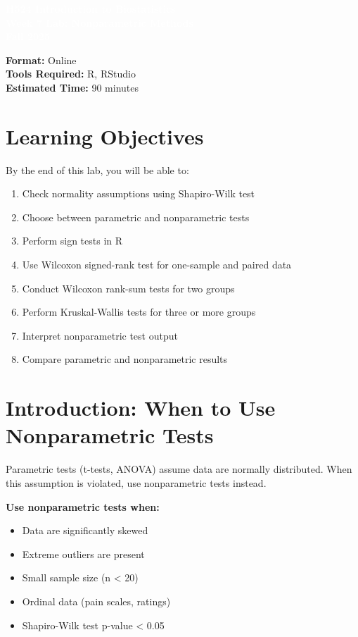 \documentclass[11pt]{article}
\title{}
\author{}
\date{}
\begin{document}
\begin{tcolorbox}[colback=osaorange,colframe=black,boxrule=2pt,arc=0pt,left=3pt,right=3pt,top=6pt,bottom=6pt,boxsep=2pt]
\centering
\textcolor{white}{\textbf{\Large H524 Introduction to Biostatistics}}\\
\textcolor{white}{\textbf{\Large Week 7 Lab: Nonparametric Methods}}\\
\textcolor{white}{\textbf{\Large Fall 2025}}
\end{tcolorbox}

\vspace{8pt}

\noindent\textbf{Format:} Online\\
\textbf{Tools Required:} R, RStudio\\
\textbf{Estimated Time:} 90 minutes

\section{Learning Objectives}

By the end of this lab, you will be able to:
\begin{enumerate}
\item Check normality assumptions using Shapiro-Wilk test
\item Choose between parametric and nonparametric tests
\item Perform sign tests in R
\item Use Wilcoxon signed-rank test for one-sample and paired data
\item Conduct Wilcoxon rank-sum tests for two groups
\item Perform Kruskal-Wallis tests for three or more groups
\item Interpret nonparametric test output
\item Compare parametric and nonparametric results
\end{enumerate}

\section{Introduction: When to Use Nonparametric Tests}

Parametric tests (t-tests, ANOVA) assume data are normally distributed. When this assumption is violated, use nonparametric tests instead.

\vspace{0.3cm}
\textbf{Use nonparametric tests when:}
\begin{itemize}
\item Data are significantly skewed
\item Extreme outliers are present
\item Small sample size (n < 20)
\item Ordinal data (pain scales, ratings)
\item Shapiro-Wilk test p-value < 0.05
\end{itemize}
\end{document}
